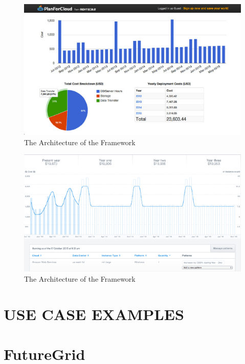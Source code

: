 \documentclass{sig-alternate}
\begin{document}
\begin{figure}[htb] 
  \centering 
    \includegraphics[width=1.0\columnwidth]{images/fig3b.pdf} 
  \caption{The Architecture of the Framework}\label{F:fig7} 
\end{figure} 

\begin{figure}[htb] 
  \centering 
    \includegraphics[width=1.0\columnwidth]{images/fig4b.pdf} 
  \caption{The Architecture of the Framework}\label{F:fig8} 
\end{figure} 


\section{USE CASE EXAMPLES}

\section{FutureGrid}
\end{document}
